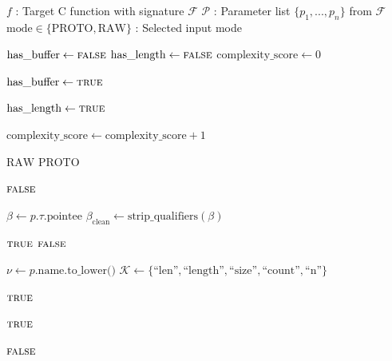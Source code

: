 \begin{algorithm}[H]
\caption{Input Mode Selection: Protocol Buffer vs Pass-Through}
\label{alg:input_mode_selection}
\begin{algorithmic}[1]
\REQUIRE $f$ : Target C function with signature $\mathcal{F}$
\REQUIRE $\mathcal{P}$ : Parameter list $\{p_1, ..., p_n\}$ from $\mathcal{F}$
\ENSURE $\text{mode} \in \{\text{PROTO}, \text{RAW}\}$ : Selected input mode

    \STATE $\text{has\_buffer} \leftarrow \textsc{false}$
    \STATE $\text{has\_length} \leftarrow \textsc{false}$
    \STATE $\text{complexity\_score} \leftarrow 0$

    \STATE {}
            \STATE $\text{has\_buffer} \leftarrow \textsc{true}$
        \ENDIF

            \STATE $\text{has\_length} \leftarrow \textsc{true}$
        \ENDIF

            \STATE $\text{complexity\_score} \leftarrow \text{complexity\_score} + 1$
        \ENDIF
    \ENDFOR

    \STATE {}
        \RETURN $\text{RAW}$ 
    \ELSE
        \RETURN $\text{PROTO}$ 
    \ENDIF
\ENDPROCEDURE

\vspace{0.3cm}

        \RETURN $\textsc{false}$
    \ENDIF

    \STATE $\beta \leftarrow p.\tau.\text{pointee}$ 
    \STATE $\beta_{\text{clean}} \leftarrow \text{strip\_qualifiers}(\beta)$

        \RETURN $\textsc{true}$
    \ELSE
        \RETURN $\textsc{false}$
    \ENDIF
\ENDPROCEDURE

\vspace{0.3cm}

    \STATE $\nu \leftarrow p.\text{name}.\text{to\_lower()}$
    \STATE $\mathcal{K} \leftarrow \{\text{``len''}, \text{``length''}, \text{``size''}, \text{``count''}, \text{``n''}\}$

        \RETURN $\textsc{true}$
    \ENDIF

            \RETURN $\textsc{true}$
        \ENDIF
    \ENDIF

    \RETURN $\textsc{false}$
\ENDPROCEDURE

\end{algorithmic}
\end{algorithm}

